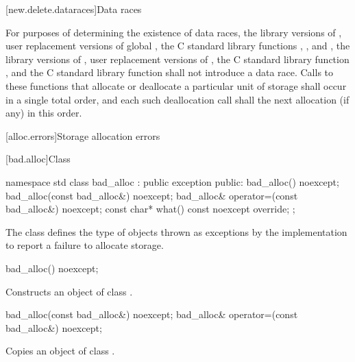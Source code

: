 [new.delete.dataraces]{Data races}

\pnum
For purposes of determining the existence of data races, the library versions
of , user replacement versions of global ,
the C standard library functions
, , and ,
the library
versions of , user replacement
versions of , the C standard library function
, and the C standard library function  shall not
introduce a data race.
Calls to these functions that allocate or deallocate a particular unit
of storage shall occur in a single total order, and each such deallocation call
shall 
the next allocation (if any) in this order.

[alloc.errors]{Storage allocation errors}

%
[bad.alloc]{Class }

\begin{codeblock}
namespace std {
  class bad_alloc : public exception {
  public:
    bad_alloc() noexcept;
    bad_alloc(const bad_alloc&) noexcept;
    bad_alloc& operator=(const bad_alloc&) noexcept;
    const char* what() const noexcept override;
  };
}
\end{codeblock}

\pnum
The class
defines the type of objects thrown as
exceptions by the implementation to report a failure to allocate storage.

%
\begin{itemdecl}
bad_alloc() noexcept;
\end{itemdecl}

\begin{itemdescr}
\pnum
\effects
Constructs an object of class
.
\end{itemdescr}

%
%
\begin{itemdecl}
bad_alloc(const bad_alloc&) noexcept;
bad_alloc& operator=(const bad_alloc&) noexcept;
\end{itemdecl}

\begin{itemdescr}
\pnum
\effects
Copies an object of class
.
\end{itemdescr}

